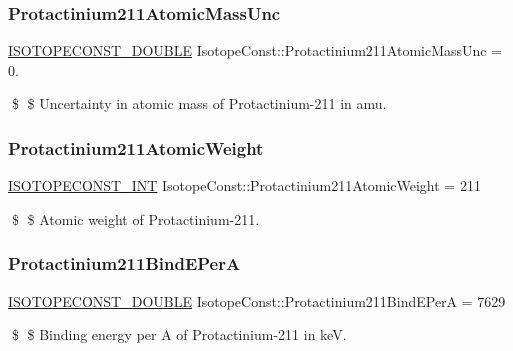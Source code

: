 \subsubsection{\texorpdfstring{Protactinium211\+Atomic\+Mass\+Unc}{Protactinium211AtomicMassUnc}}
{\footnotesize\ttfamily \mbox{\hyperlink{group___isotope_const-_macros_ga8f45a7272ce02c0b4c65c44636ed719a}{I\+S\+O\+T\+O\+P\+E\+C\+O\+N\+S\+T\+\_\+\+D\+O\+U\+B\+LE}} Isotope\+Const\+::\+Protactinium211\+Atomic\+Mass\+Unc = 0.}

\$ \$ Uncertainty in atomic mass of Protactinium-\/211 in amu. \mbox{\label{group___isotope_const-_protactinium-_pa211_ga113da984e119faa256d6c3315f7f9936}} 
\subsubsection{\texorpdfstring{Protactinium211\+Atomic\+Weight}{Protactinium211AtomicWeight}}
{\footnotesize\ttfamily \mbox{\hyperlink{group___isotope_const-_macros_ga5f18360b3e99483a35c32d789e62621c}{I\+S\+O\+T\+O\+P\+E\+C\+O\+N\+S\+T\+\_\+\+I\+NT}} Isotope\+Const\+::\+Protactinium211\+Atomic\+Weight = 211}

\$ \$ Atomic weight of Protactinium-\/211. \mbox{\label{group___isotope_const-_protactinium-_pa211_ga96d32d2430bc84d56e7e471b3262e6bb}} 
\subsubsection{\texorpdfstring{Protactinium211\+Bind\+E\+PerA}{Protactinium211BindEPerA}}
{\footnotesize\ttfamily \mbox{\hyperlink{group___isotope_const-_macros_ga8f45a7272ce02c0b4c65c44636ed719a}{I\+S\+O\+T\+O\+P\+E\+C\+O\+N\+S\+T\+\_\+\+D\+O\+U\+B\+LE}} Isotope\+Const\+::\+Protactinium211\+Bind\+E\+PerA = 7629}

\$ \$ Binding energy per A of Protactinium-\/211 in keV. \mbox{\label{group___isotope_const-_protactinium-_pa211_ga43f8fb537ed0bd1665e44c69806d2bc9}} 
